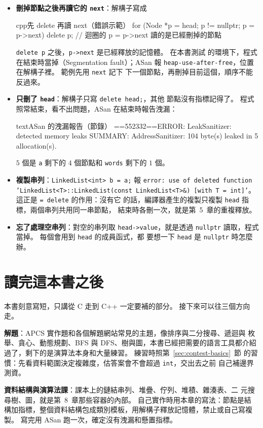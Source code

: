 \begin{itemize}
\item \textbf{刪掉節點之後再讀它的 \texttt{next}}：解構子寫成
\begin{code}{cpp}{先 delete 再讀 next（錯誤示範）}
for (Node *p = head; p != nullptr; p = p->next) {
    delete p;        // 迴圈的 p = p->next 讀的是已經刪掉的節點
}
\end{code}
\texttt{delete p} 之後，\texttt{p->next} 是已經釋放的記憶體。 在本書測試
的環境下，程式在結束時當掉（Segmentation fault）；ASan 報
\texttt{heap-use-after-free}，位置在解構子裡。 範例先用 \texttt{next} 記下
下一個節點，再刪掉目前這個，順序不能反過來。
\item \textbf{只刪了 \texttt{head}}：解構子只寫 \texttt{delete head;}，其他
節點沒有指標記得了。 程式照常結束，看不出問題，ASan 在結束時報告洩漏：
\begin{code}{text}{ASan 的洩漏報告（節錄）}
==552332==ERROR: LeakSanitizer: detected memory leaks
SUMMARY: AddressSanitizer: 104 byte(s) leaked in 5 allocation(s).
\end{code}
$5$ 個是 \texttt{a} 剩下的 $4$ 個節點和 \texttt{words} 剩下的 $1$ 個。
\item \textbf{複製串列}：\texttt{LinkedList<int> b = a;} 報
\texttt{error: use of deleted function 'LinkedList<T>::LinkedList(const
LinkedList<T>\&) [with T = int]'}。 這正是 \texttt{= delete} 的作用：沒有它
的話，編譯器產生的複製只複製 \texttt{head} 指標，兩個串列共用同一串節點，
結束時各刪一次，就是第~5~章的重複釋放。
\item \textbf{忘了處理空串列}：對空的串列取 \texttt{head->value}，就是透過
\texttt{nullptr} 讀取，程式當掉。 每個會用到 \texttt{head} 的成員函式，都
要想一下 \texttt{head} 是 \texttt{nullptr} 時怎麼辦。
\end{itemize}

\section{讀完這本書之後}
\label{sec:next}

本書刻意寫短，只講從 C 走到 C++ 一定要補的部分。 接下來可以往三個方向走。

\textbf{解題}：APCS 實作題和各個解題網站常見的主題，像排序與二分搜尋、遞迴與
枚舉、貪心、動態規劃、BFS 與 DFS、樹與圖，本書已經把需要的語言工具都介紹
過了，剩下的是演算法本身和大量練習。 練習時照第~\ref{sec:contest-basics}~節
的習慣：先看資料範圍決定複雜度，估答案會不會超過 \texttt{int}，交出去之前
自己補邊界測資。

\textbf{資料結構與演算法課}：課本上的鏈結串列、堆疊、佇列、堆積、雜湊表、二
元搜尋樹、圖，就是第~8~章那些容器的內部。 自己實作時用本章的寫法：節點是結
構加指標，整個資料結構包成類別模板，用解構子釋放記憶體，禁止或自己寫複製。
寫完用 ASan 跑一次，確定沒有洩漏和懸置指標。


